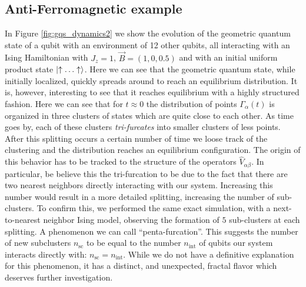 \documentclass[%
 reprint,
 superscriptaddress,
 aps,
 pra,
]{revtex4-2}
\theoremstyle{definition}
\begin{document}
\subsection*{Anti-Ferromagnetic example}
In Figure \ref{fig:gqs_dynamics2} 
we show the evolution of the geometric quantum state of a qubit with an environment of 12 other
qubits, all interacting with an Ising Hamiltonian with $J_z=1$, $\vec{B}=(1,0,0.5)$ and 
with an initial uniform product state $\ket{\uparrow \ldots \uparrow}$. Here we can see that
the geometric quantum state, while initially localized, quickly spreads around to reach an 
equilibrium distribution. It is, however, interesting to see that it reaches equilibrium with 
a highly structured fashion. Here we can see that for $t\approx 0$ the distribution of points 
$\Gamma_\alpha(t)$ is organized in three clusters of states which are quite close to each other. 
As time goes by, each of these clusters \emph{tri-furcates} into smaller clusters of less points. 
After this splitting occurs a certain number of time we loose track of the clustering and the distribution reaches
an equilibrium configuration. The origin of this behavior has to be tracked to the structure of the
operators $\hat{V}_{\alpha \beta}$. In particular, be believe this the tri-furcation to be due to the fact 
that there are two nearest neighbors directly interacting with our system. Increasing this number 
would result in a more detailed splitting, increasing the number of sub-clusters. To confirm this, 
we performed the same exact simulation, with a next-to-nearest neighbor Ising model, observing 
the formation of $5$ sub-clusters at each splitting. A phenomenon we can call ``penta-furcation''. 
This suggests the number of new subclusters $n_{\mathrm{sc}}$ to be equal to the number 
$n_{\mathrm{int}}$ of qubits our system interacts directly with: $n_{\mathrm{sc}} = n_{\mathrm{int}}$.
While we do not have a definitive explanation for this phenomenon, it has a distinct, and 
unexpected, fractal flavor which deserves further investigation.
\end{document}
